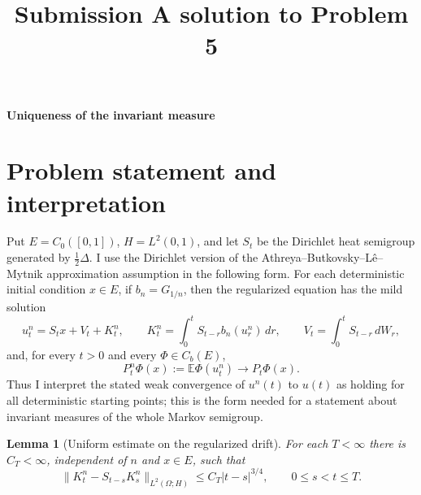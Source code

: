 \documentclass[12pt]{article}
\newtheorem{lemma}{Lemma}
\newcommand{\E}{\mathbb E}
\newcommand{\1}{\mathbf 1}
\begin{document}
\title{Submission A solution to Problem 5}
\date{}
\maketitle

\begin{center}
{\bf Uniqueness of the invariant measure}
\end{center}

\section*{Problem statement and interpretation}

Put \(E=C_0([0,1])\), \(H=L^2(0,1)\), and let \(S_t\) be the Dirichlet heat
semigroup generated by \(\frac12\Delta\).  I use the Dirichlet version of the
Athreya--Butkovsky--L\^e--Mytnik approximation assumption in the following
form.  For each deterministic initial condition \(x\in E\), if \(b_n=G_{1/n}\),
then the regularized equation has the mild solution
\[
  u_t^n=S_t x+V_t+K_t^n,\qquad
  K_t^n=\int_0^tS_{t-r}b_n(u_r^n)\,dr,\qquad
  V_t=\int_0^tS_{t-r}\,dW_r ,
\]
and, for every \(t>0\) and every \(\Phi\in C_b(E)\),
\[
        P_t^n\Phi(x):=\E\Phi(u_t^n)\longrightarrow P_t\Phi(x).
        \tag{1}
\]
Thus I interpret the stated weak convergence of \(u^n(t)\) to \(u(t)\) as
holding for all deterministic starting points; this is the form needed for a
statement about invariant measures of the whole Markov semigroup.

\begin{lemma}[Uniform estimate on the regularized drift]\label{lem:Hestimate}
For each \(T<\infty\) there is \(C_T<\infty\), independent of \(n\) and
\(x\in E\), such that
\[
 \|K_t^n-S_{t-s}K_s^n\|_{L^2(\Omega;H)}
      \le C_T |t-s|^{3/4},\qquad 0\le s<t\le T .             \tag{2}
\]
\end{lemma}
\end{document}
